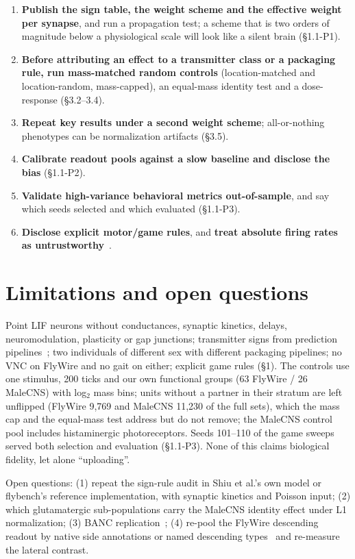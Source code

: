 \documentclass[11pt,a4paper]{article}
\begin{document}
\begin{enumerate}
\item \textbf{Publish the sign table, the weight scheme and the effective
weight per synapse}, and run a propagation test; a scheme that is two orders
of magnitude below a physiological scale will look like a silent brain
(\S1.1-P1).
\item \textbf{Before attributing an effect to a transmitter class or a
packaging rule, run mass-matched random controls} (location-matched and
location-random, mass-capped), an equal-mass identity test and a
dose-response (\S3.2--3.4).
\item \textbf{Repeat key results under a second weight scheme}; all-or-nothing
phenotypes can be normalization artifacts (\S3.5).
\item \textbf{Calibrate readout pools against a slow baseline and disclose the
bias} (\S1.1-P2).
\item \textbf{Validate high-variance behavioral metrics out-of-sample}, and
say which seeds selected and which evaluated (\S1.1-P3).
\item \textbf{Disclose explicit motor/game rules}, and \textbf{treat absolute
firing rates as untrustworthy}~\cite{fbm}.
\end{enumerate}

\section{Limitations and open questions}

Point LIF neurons without conductances, synaptic kinetics, delays,
neuromodulation, plasticity or gap junctions; transmitter signs from
prediction pipelines~\cite{eckstein2024}; two individuals of different sex
with different packaging pipelines; no VNC on FlyWire and no gait on either;
explicit game rules (\S1). The controls use one stimulus, 200 ticks and our
own functional groups (63 FlyWire / 26 MaleCNS) with log$_2$ mass bins; units
without a partner in their stratum are left unflipped (FlyWire 9,769 and
MaleCNS 11,230 of the full sets), which the mass cap and the equal-mass test
address but do not remove; the MaleCNS control pool includes histaminergic
photoreceptors. Seeds 101--110 of the game sweeps served both selection and
evaluation (\S1.1-P3). None of this claims biological fidelity, let alone
``uploading''.

Open questions: (1) repeat the sign-rule audit in Shiu et al.'s own model or
flybench's reference implementation, with synaptic kinetics and Poisson input;
(2) which glutamatergic sub-populations carry the MaleCNS identity effect under
L1 normalization; (3) BANC replication~\cite{bates2026}; (4) re-pool the
FlyWire descending readout by native side annotations or named descending
types~\cite{sturner2025} and re-measure the lateral contrast.
\end{document}
